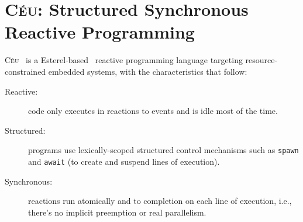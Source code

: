 \documentclass[sigplan,10pt,review,anonymous]{acmart}\settopmatter{printfolios=true,printccs=false,printacmref=false}
\newcommand{\CEU}{\textsc{C\'{e}u}\xspace}
\newcommand{\code}[1] {{\small{\texttt{#1}}}}
\begin{document}

\section{\CEU: Structured Synchronous Reactive Programming}
\label{sec.ceu}

\CEU~\cite{ceu.sensys13} is a Esterel-based~\cite{ceu.tecs17} reactive
programming language targeting resource-constrained embedded systems, with the
characteristics that follow:
%
\begin{description}
\item [Reactive:] code only executes in reactions to events and is idle most of
    the time.
\item [Structured:] programs use lexically-scoped structured control
    mechanisms such as \code{spawn} and \code{await} (to create and suspend
    lines of execution).
\item [Synchronous:] reactions run atomically and to completion on each line of
    execution, i.e., there's no implicit preemption or real parallelism.
\end{description}
\end{document}
